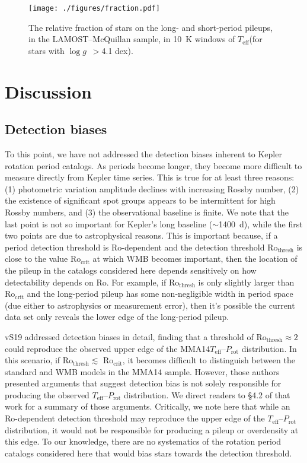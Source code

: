 \documentclass[trackchanges,twocolumn]{aastex631}
\newcommand{\rocrit}{$\mathrm{Ro_{crit}}$\xspace}
\newcommand{\rothresh}{$\mathrm{Ro_{thresh}}$\xspace}
\newcommand{\lamostmcq}{LAMOST--McQuillan\xspace}
\newcommand{\jvs}{vS19\xspace}
\newcommand{\mma}{MMA14\xspace}
\newcommand{\teff}{\ensuremath{T_{\mathrm{eff}}}\xspace}
\newcommand{\logg}{\ensuremath{\log g}\xspace}
\newcommand{\prot}{\ensuremath{P_\mathrm{rot}}\xspace}
\begin{document}
\begin{figure}
    \centering
    \texttt{[image: ./figures/fraction.pdf]}
    \caption{The relative fraction of stars on the long- and short-period pileups, in the \lamostmcq sample, in 10~K windows of \teff (for stars with \logg~$>$4.1 dex).}
    \label{fig:fraction}
\end{figure}




\section{Discussion} \label{sec:discussion}

\subsection{Detection biases}
\label{subsec:detectionbias}
To this point, we have not addressed the detection biases inherent to Kepler rotation period catalogs. As periods become longer, they become more difficult to measure directly from Kepler time series. This is true for at least three reasons: (1) photometric variation amplitude declines with increasing Rossby number, (2) the existence of significant spot groups appears to be intermittent for high Rossby numbers, and (3) the observational baseline is finite. We note that the last point is not so important for Kepler's long baseline ($\sim$1400~d), while the first two points are due to astrophysical reasons. This is important because, if a period detection threshold is Ro-dependent and the detection threshold Ro$_\mathrm{thresh}$ is close to the value \rocrit at which WMB becomes important, then the location of the pileup in the catalogs considered here depends sensitively on how detectability depends on Ro. For example, if Ro$_\mathrm{thresh}$ is only slightly larger than \rocrit and the long-period pileup has some non-negligible width in period space (due either to astrophysics or measurement error), then it's possible the current data set only reveals the lower edge of the long-period pileup.

\jvs addressed detection biases in detail, finding that a threshold of Ro$_\mathrm{thresh} \approx 2$ could reproduce the observed upper edge of the \mma \teff–\prot distribution. In this scenario, if \rothresh $\lesssim$ \rocrit, it becomes difficult to distinguish between the standard and WMB models in the \mma sample. However, those authors presented arguments that suggest detection bias is not solely responsible for producing the observed \teff–\prot distribution. We direct readers to \S4.2 of that work for a summary of those arguments. Critically, we note here that while an Ro-dependent detection threshold may reproduce the upper edge of the \teff–\prot distribution, it would not be responsible for producing a pileup or overdensity at this edge. To our knowledge, there are no systematics of the rotation period catalogs considered here that would bias stars towards the detection threshold.
\end{document}
